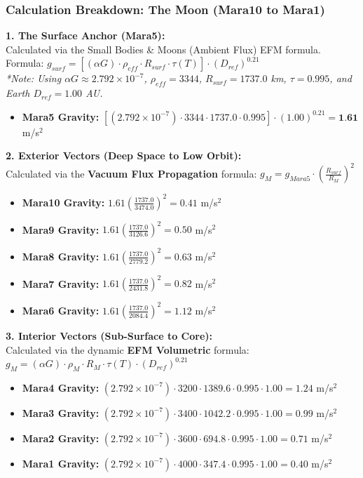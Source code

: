 \documentclass[11pt, a4paper]{article}
\begin{document}
\clearpage
\subsubsection{Calculation Breakdown: The Moon (Mara10 to Mara1)}

\noindent \textbf{1. The Surface Anchor (Mara5):} \\
Calculated via the Small Bodies \& Moons (Ambient Flux) EFM formula. \\
Formula: $g_{surf} = \left[ (\alpha G) \cdot \rho_{eff} \cdot R_{surf} \cdot \tau(T) \right] \cdot (D_{ref})^{0.21}$ \\
\textit{*Note: Using $\alpha G \approx 2.792 \times 10^{-7}$, $\rho_{eff} = 3344$, $R_{surf} = 1737.0$ km, $\tau = 0.995$, and Earth $D_{ref} = 1.00$ AU.}
\begin{itemize}
  \item \textbf{Mara5 Gravity:} $\left[ (2.792 \times 10^{-7}) \cdot 3344 \cdot 1737.0 \cdot 0.995 \right] \cdot (1.00)^{0.21} = \textbf{1.61}$ m/s$^2$
\end{itemize}

\vspace{0.5em}
\noindent \textbf{2. Exterior Vectors (Deep Space to Low Orbit):} \\
Calculated via the \textbf{Vacuum Flux Propagation} formula: $g_M = g_{Mara5} \cdot \left( \frac{R_{surf}}{R_M} \right)^2$
\begin{itemize}
  \item \textbf{Mara10 Gravity:} $1.61 \left( \frac{1737.0}{3474.0} \right)^2 = 0.41$ m/s$^2$
  \item \textbf{Mara9 Gravity:} $1.61 \left( \frac{1737.0}{3126.6} \right)^2 = 0.50$ m/s$^2$
  \item \textbf{Mara8 Gravity:} $1.61 \left( \frac{1737.0}{2779.2} \right)^2 = 0.63$ m/s$^2$
  \item \textbf{Mara7 Gravity:} $1.61 \left( \frac{1737.0}{2431.8} \right)^2 = 0.82$ m/s$^2$
  \item \textbf{Mara6 Gravity:} $1.61 \left( \frac{1737.0}{2084.4} \right)^2 = 1.12$ m/s$^2$
\end{itemize}

\vspace{0.5em}
\noindent \textbf{3. Interior Vectors (Sub-Surface to Core):} \\
Calculated via the dynamic \textbf{EFM Volumetric} formula: $g_M = (\alpha G) \cdot \rho_{M} \cdot R_M \cdot \tau(T) \cdot (D_{ref})^{0.21}$
\begin{itemize}
  \item \textbf{Mara4 Gravity:} $(2.792 \times 10^{-7}) \cdot 3200 \cdot 1389.6 \cdot 0.995 \cdot 1.00 = 1.24$ m/s$^2$
  \item \textbf{Mara3 Gravity:} $(2.792 \times 10^{-7}) \cdot 3400 \cdot 1042.2 \cdot 0.995 \cdot 1.00 = 0.99$ m/s$^2$
  \item \textbf{Mara2 Gravity:} $(2.792 \times 10^{-7}) \cdot 3600 \cdot 694.8 \cdot 0.995 \cdot 1.00 = 0.71$ m/s$^2$
  \item \textbf{Mara1 Gravity:} $(2.792 \times 10^{-7}) \cdot 4000 \cdot 347.4 \cdot 0.995 \cdot 1.00 = 0.40$ m/s$^2$
\end{itemize}
\end{document}
